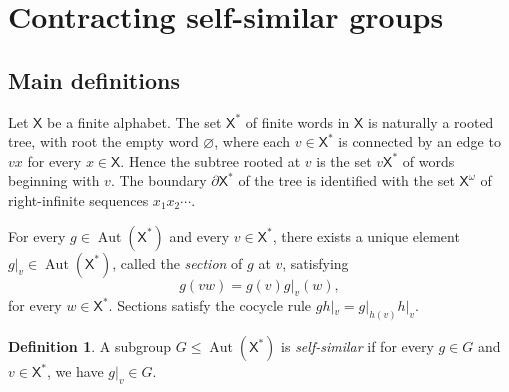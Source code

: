 \documentclass[11pt]{amsart}
\newcommand{\xs}{\alb^\ast}
\newcommand{\xo}{\alb^\omega}
\newcommand{\aut}{\ensuremath{\operatorname{Aut}}}%
\newcommand{\alb}{\ensuremath{\mathsf{X}}}%
\theoremstyle{definition}
\newtheorem{defin}{Definition}[section]
\theoremstyle{plain}
\newtheorem{main thm}{Theorem}
\theoremstyle{remark}
\theoremstyle{plain}
\begin{document}
\section{Contracting self-similar groups}
\label{s-cutpoints}
    



    

    \subsection{Main definitions}
\label{s-preliminaries-contracting}
Let $\alb$ be a finite alphabet. The set $\alb^\ast$ of finite words in $\alb$ is naturally a rooted tree, with root the empty word $\varnothing$, where each $v\in \alb^\ast$ is connected by an edge to $vx$ for every $x\in \alb$. Hence the subtree rooted at $v$ is the set $v\alb^\ast$ of words beginning with $v$. The boundary $\partial \xs$ of the tree is identified with the set $\xo$ of right-infinite sequences $x_1x_2\cdots$.
		
		
		For every $g\in \aut(\alb^\ast)$ and every $v\in \alb^\ast$, there exists a unique element $g|_v\in \aut(\alb^\ast)$, called the \emph{section} of $g$ at $v$, satisfying 	\[g(vw)=g(v)g|_v(w),\]
		for every $w\in \alb^\ast$. Sections satisfy the cocycle rule $gh|_v=g|_{h(v)}h|_v$.
        
		\begin{defin}
        \label{def:selfsimilar1}
		A subgroup $G\le \aut(\alb^\ast)$ is \emph{self-similar} if for every $g\in G$ and $v\in \alb^\ast$, we have $g|_v\in G$. 
		\end{defin} 
\end{document}
